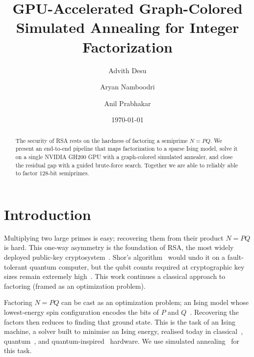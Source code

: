 \documentclass[reprint,twocolumn,amsmath,amssymb,nofootinbib]{revtex4-2}
\begin{document}
\title{GPU-Accelerated Graph-Colored Simulated Annealing
for Integer Factorization}

\author{Advith Desu}
\author{Aryan Namboodri}
\author{Anil Prabhakar}

\date{\today}

\begin{abstract}
The security of RSA rests on the hardness of factoring a semiprime $N = PQ$. We present an end-to-end pipeline that maps factorization to a sparse Ising model, solve it on a single NVIDIA GH200 GPU with a graph-colored simulated annealer, and close the residual gap with a guided brute-force search. Together we are able to reliably able to factor $128$-bit semiprimes.
\end{abstract}

\maketitle

\section{Introduction}\label{sec:intro}

Multiplying two large primes is easy; recovering them from their product $N = PQ$ is hard. This one-way asymmetry is the foundation of RSA, the most widely deployed public-key cryptosystem~\cite{RSA1978}. Shor's algorithm~\cite{Shor1997} would undo it on a fault-tolerant quantum computer, but the qubit counts required at cryptographic key sizes remain extremely high~\cite{Jain2016}. This work continues a classical approach to factoring (framed as an optimization problem).

Factoring $N = PQ$ can be cast as an optimization problem; an Ising model whose lowest-energy spin configuration encodes the bits of $P$ and $Q$~\cite{Jiang2018,Wang2020}. Recovering the factors then reduces to finding that ground state. This is the task of an Ising machine, a solver built to minimise an Ising energy, realised today in classical~\cite{Aramon2019}, quantum~\cite{Johnson2011}, and quantum-inspired~\cite{Goto2019} hardware. We use simulated annealing~\cite{Kirkpatrick1983,Preis2009} for this task.
\end{document}
